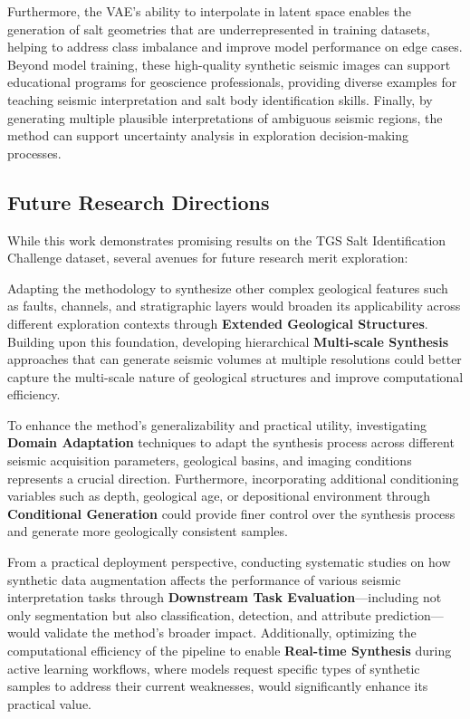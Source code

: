 \documentclass{ieeeaccess}
\begin{document}
Furthermore, the VAE's ability to interpolate in latent space enables the generation of salt geometries that are underrepresented in training datasets, helping to address class imbalance and improve model performance on edge cases. Beyond model training, these high-quality synthetic seismic images can support educational programs for geoscience professionals, providing diverse examples for teaching seismic interpretation and salt body identification skills. Finally, by generating multiple plausible interpretations of ambiguous seismic regions, the method can support uncertainty analysis in exploration decision-making processes.


\subsection{Future Research Directions}

While this work demonstrates promising results on the TGS Salt Identification Challenge dataset, several avenues for future research merit exploration:

Adapting the methodology to synthesize other complex geological features such as faults, channels, and stratigraphic layers would broaden its applicability across different exploration contexts through \textbf{Extended Geological Structures}. Building upon this foundation, developing hierarchical \textbf{Multi-scale Synthesis} approaches that can generate seismic volumes at multiple resolutions could better capture the multi-scale nature of geological structures and improve computational efficiency.

To enhance the method's generalizability and practical utility, investigating \textbf{Domain Adaptation} techniques to adapt the synthesis process across different seismic acquisition parameters, geological basins, and imaging conditions represents a crucial direction. Furthermore, incorporating additional conditioning variables such as depth, geological age, or depositional environment through \textbf{Conditional Generation} could provide finer control over the synthesis process and generate more geologically consistent samples.

From a practical deployment perspective, conducting systematic studies on how synthetic data augmentation affects the performance of various seismic interpretation tasks through \textbf{Downstream Task Evaluation}—including not only segmentation but also classification, detection, and attribute prediction—would validate the method's broader impact. Additionally, optimizing the computational efficiency of the pipeline to enable \textbf{Real-time Synthesis} during active learning workflows, where models request specific types of synthetic samples to address their current weaknesses, would significantly enhance its practical value.
\end{document}

